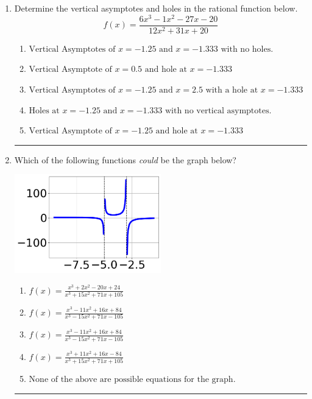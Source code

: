 \documentclass[14pt]{extbook}
\newcommand{\litem}[1]{\item#1\hspace*{-1cm}\rule{\textwidth}{0.4pt}}
\begin{document}
\begin{enumerate}
{\begin{enumerate}[label=\Alph*.]
\end{enumerate} }
\litem{
Determine the vertical asymptotes and holes in the rational function below.\[ f(x) = \frac{6x^{3} -1 x^{2} -27 x -20}{12x^{2} +31 x + 20} \]\begin{enumerate}[label=\Alph*.]
\item \( \text{Vertical Asymptotes of } x = -1.25 \text{ and } x = -1.333 \text{ with no holes.} \)
\item \( \text{Vertical Asymptote of } x = 0.5 \text{ and hole at } x = -1.333 \)
\item \( \text{Vertical Asymptotes of } x = -1.25 \text{ and } x = 2.5 \text{ with a hole at } x = -1.333 \)
\item \( \text{Holes at } x = -1.25 \text{ and } x = -1.333 \text{ with no vertical asymptotes.} \)
\item \( \text{Vertical Asymptote of } x = -1.25 \text{ and hole at } x = -1.333 \)

\end{enumerate} }
\litem{
Which of the following functions \textit{could} be the graph below?
\begin{center}
    \includegraphics[width=0.5\textwidth]{../Figures/identifyGraphOfRationalFunctionCopyC.png}
\end{center}
\begin{enumerate}[label=\Alph*.]
\item \( f(x)=\frac{x^{3} +2 x^{2} -20 x + 24}{x^{3} +15 x^{2} +71 x + 105} \)
\item \( f(x)=\frac{x^{3} -11 x^{2} +16 x + 84}{x^{3} -15 x^{2} +71 x -105} \)
\item \( f(x)=\frac{x^{3} -11 x^{2} +16 x + 84}{x^{3} -15 x^{2} +71 x -105} \)
\item \( f(x)=\frac{x^{3} +11 x^{2} +16 x -84}{x^{3} +15 x^{2} +71 x + 105} \)
\item \( \text{None of the above are possible equations for the graph.} \)


\end{enumerate}}
\end{enumerate}
\end{document}
